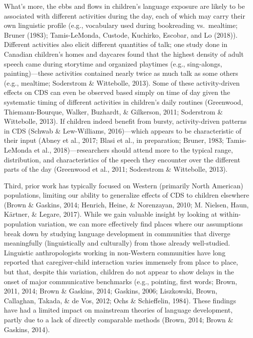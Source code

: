 \documentclass[,man,floatsintext]{apa6}
\begin{document}
What's more, the ebbs and flows in children's language exposure are
likely to be associated with different activities during the day, each
of which may carry their own linguistic profile (e.g., vocabulary used
during bookreading vs.~mealtime; Bruner (1983); Tamis-LeMonda, Custode,
Kuchirko, Escobar, and Lo (2018)). Different activities also elicit
different quantities of talk; one study done in Canadian children's
homes and daycares found that the highest density of adult speech came
during storytime and organized playtimes (e.g., sing-alongs,
painting)---these activities contained nearly twice as much talk as some
others (e.g., mealtime; Soderstrom \& Wittebolle, 2013). Some of these
activity-driven effects on CDS can even be observed based simply on time
of day given the systematic timing of different activities in children's
daily routines (Greenwood, Thiemann-Bourque, Walker, Buzhardt, \&
Gilkerson, 2011; Soderstrom \& Wittebolle, 2013). If children indeed
benefit from bursty, activity-driven patterns in CDS (Schwab \&
Lew-Williams, 2016)---which appears to be characteristic of their input
(Abney et al., 2017; Blasi et al., in preparation; Bruner, 1983;
Tamis-LeMonda et al., 2018)---researchers should attend more to the
typical range, distribution, and characteristics of the speech they
encounter over the different parts of the day (Greenwood et al., 2011;
Soderstrom \& Wittebolle, 2013).

Third, prior work has typically focused on Western (primarily North
American) populations, limiting our ability to generalize effects of CDS
to children elsewhere (Brown \& Gaskins, 2014; Henrich, Heine, \&
Norenzayan, 2010; M. Nielsen, Haun, Kärtner, \& Legare, 2017). While we
gain valuable insight by looking at within-population variation, we can
more effectively find places where our assumptions break down by
studying language development in communities that diverge meaningfully
(linguistically and culturally) from those already well-studied.
Linguistic anthropologists working in non-Western communities have long
reported that caregiver-child interaction varies immensely from place to
place, but that, despite this variation, children do not appear to show
delays in the onset of major communicative benchmarks (e.g., pointing,
first words; Brown, 2011, 2014; Brown \& Gaskins, 2014; Gaskins, 2006;
Liszkowski, Brown, Callaghan, Takada, \& de Vos, 2012; Ochs \&
Schieffelin, 1984). These findings have had a limited impact on
mainstream theories of language development, partly due to a lack of
directly comparable methods (Brown, 2014; Brown \& Gaskins, 2014).
\end{document}
